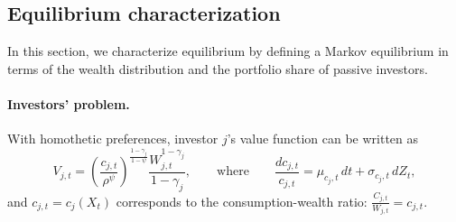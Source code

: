 


\subsection{Equilibrium characterization}\label{sec:equilibrium-char}

In this section, we characterize equilibrium by defining a Markov equilibrium in terms of the wealth distribution and the portfolio share of passive investors.

\paragraph{Investors' problem.} 
With homothetic preferences, investor $j$'s value function can be written as
\begin{equation}\nonumber
    V_{j,t} = \left( \frac{c_{j,t}}{\rho^\psi} \right)^{\frac{1-\gamma_j}{1-\psi}} 
    \frac{W_{j,t}^{1-\gamma_j}}{1-\gamma_j}, \qquad \text{where} \qquad \frac{dc_{j,t}}{c_{j,t}} = \mu_{c_j,t}\, dt + \sigma_{c_j,t}\, dZ_t,
\end{equation}
and $c_{j,t} = c_j(X_t)$ corresponds to the consumption-wealth ratio: $\frac{C_{j,t}}{W_{j,t}} = c_{j,t}$.

